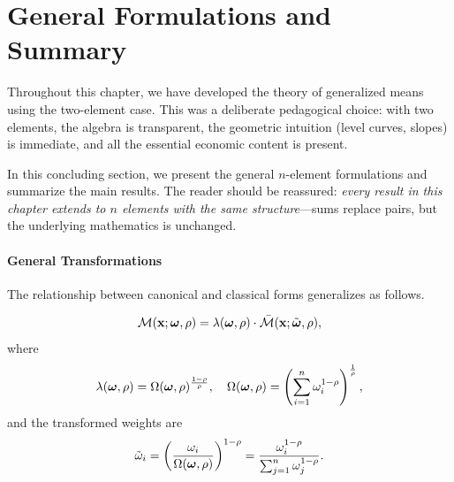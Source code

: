 \section{General Formulations and Summary}
\label{sec:general-summary}

Throughout this chapter, we have developed the theory of generalized means using the two-element case. This was a deliberate pedagogical choice: with two elements, the algebra is transparent, the geometric intuition (level curves, slopes) is immediate, and all the essential economic content is present. 

In this concluding section, we present the general $n$-element formulations and summarize the main results. The reader should be reassured: \emph{every result in this chapter extends to $n$ elements with the same structure}---sums replace pairs, but the underlying mathematics is unchanged.



\paragraph{General Transformations}

The relationship between canonical and classical forms generalizes as follows.

\begin{proposition}
\label{prop:general-transform}
\begin{equation}
\mathcal{M}(\mathbf{x}; \boldsymbol{\omega}, \rho) = \lambda(\boldsymbol{\omega}, \rho) \cdot \bar{\mathcal{M}}(\mathbf{x}; \tilde{\boldsymbol{\omega}}, \rho),
\end{equation}
where
\begin{equation}
\lambda(\boldsymbol{\omega}, \rho) = \Omega(\boldsymbol{\omega}, \rho)^{\frac{1-\rho}{\rho}}, \quad \Omega(\boldsymbol{\omega}, \rho) = \left( \sum_{i=1}^n \omega_i^{1-\rho} \right)^{\frac{1}{\rho}},
\end{equation}
and the transformed weights are
\begin{equation}
\tilde{\omega}_i = \left( \frac{\omega_i}{\Omega(\boldsymbol{\omega}, \rho)} \right)^{1-\rho} = \frac{\omega_i^{1-\rho}}{\sum_{j=1}^n \omega_j^{1-\rho}}.
\end{equation}
\end{proposition}

